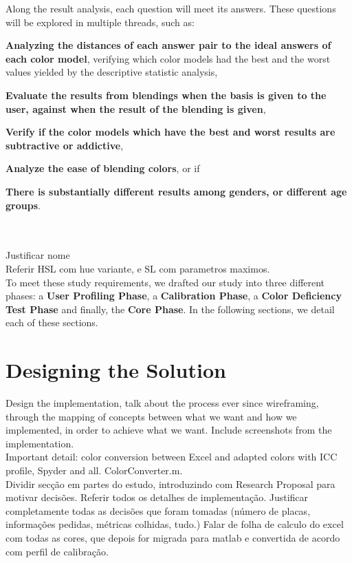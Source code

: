 %
Along the result analysis, each question will meet its answers. These questions will be explored in multiple threads, such as:
%
\begin{enumerate*}
		\item \textbf{Analyzing the distances of each answer pair to the ideal answers of each color model}, verifying which color models had the best and the worst
		values yielded by the descriptive statistic analysis,
		\item \textbf{Evaluate the results from blendings when the basis is given to the user, against when the result of the blending is given},
		\item \textbf{Verify if the color models which have the best and worst results are subtractive or addictive},
		\item \textbf{Analyze the ease of blending colors}, or if
		\item \textbf{There is substantially different results among genders, or different age groups}.
\end{enumerate*}
\\ \\
%
Justificar nome \\
Referir HSL com hue variante, e SL com parametros maximos. \\

To meet these study requirements, we drafted our study into three different phases: a \textbf{User Profiling Phase}, a \textbf{Calibration Phase}, a \textbf{Color Deficiency Test Phase} and finally, the \textbf{Core Phase}. In the following sections, we detail each of these sections. \par
%
\section{Designing the Solution}
\label{sec:impl_designingsolution}
Design the implementation, talk about the process ever since wireframing, through the mapping of concepts between
what we want and how we implemented, in order to achieve what we want. Include screenshots from the implementation. \\

Important detail: color conversion between Excel and adapted colors with ICC profile, Spyder and all. ColorConverter.m. \\
%
Dividir secção em partes do estudo, introduzindo com Research Proposal para motivar decisões. Referir todos os detalhes de implementação.
Justificar completamente todas as decisões que foram tomadas (número de placas, informações pedidas, métricas colhidas, tudo.)
%
Falar de folha de calculo do excel com todas as cores, que depois for migrada para matlab
e convertida de acordo com perfil de calibração.

